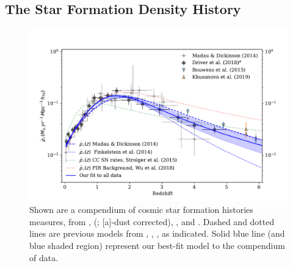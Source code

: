 \documentclass[apj, linenumbers]{aastex62}
\begin{document}
\subsection{The Star Formation Density History}\label{sec:csfh}
\begin{figure}[t]
   \centering
   \includegraphics[width=6.1in]{figure_csfh_today.pdf}
   \caption{\footnotesize Shown are a compendium of cosmic star formation histories measures, from \cite{Madau:2014fk}, \citeauthor{Driver:2018nr} (\citeyear{Driver:2018nr}; [a]-dust corrected), \cite{Bouwens:2015qy}, and \cite{Khusanova:2019kx}. Dashed and dotted lines are previous models from \cite{Madau:2014fk}, \cite{Finkelstein:2014fj}, \cite{Strolger:2015aa}, as indicated. Solid blue line (and blue shaded region) represent our best-fit model to the compendium of data.}
   \label{fig:csfhs}
\end{figure}
\end{document}

